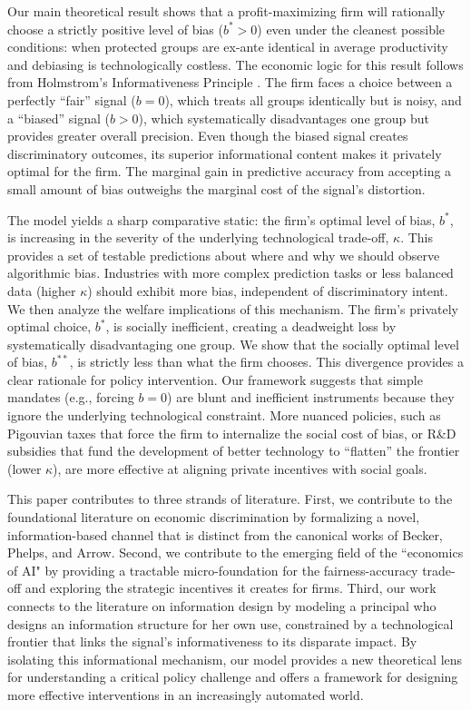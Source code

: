 Our main theoretical result shows that a profit-maximizing firm will rationally choose a strictly positive level of bias ($b^* > 0$) even under the cleanest possible conditions: when protected groups are ex-ante identical in average productivity and debiasing is technologically costless. The economic logic for this result follows from Holmstrom's Informativeness Principle \citep{Holmstrom1979} . The firm faces a choice between a perfectly ``fair'' signal ($b=0$), which treats all groups identically but is noisy, and a ``biased'' signal ($b>0$), which systematically disadvantages one group but provides greater overall precision. Even though the biased signal creates discriminatory outcomes, its superior informational content makes it privately optimal for the firm. The marginal gain in predictive accuracy from accepting a small amount of bias outweighs the marginal cost of the signal's distortion.

The model yields a sharp comparative static: the firm's optimal level of bias, $b^*$, is increasing in the severity of the underlying technological trade-off, $\kappa$. This provides a set of testable predictions about where and why we should observe algorithmic bias. Industries with more complex prediction tasks or less balanced data (higher $\kappa$) should exhibit more bias, independent of discriminatory intent. We then analyze the welfare implications of this mechanism. The firm's privately optimal choice, $b^*$, is socially inefficient, creating a deadweight loss by systematically disadvantaging one group. We show that the socially optimal level of bias, $b^{**}$, is strictly less than what the firm chooses. This divergence provides a clear rationale for policy intervention. Our framework suggests that simple mandates (e.g., forcing $b=0$) are blunt and inefficient instruments because they ignore the underlying technological constraint. More nuanced policies, such as Pigouvian taxes that force the firm to internalize the social cost of bias, or R\&D subsidies that fund the development of better technology to ``flatten'' the frontier (lower $\kappa$), are more effective at aligning private incentives with social goals.

This paper contributes to three strands of literature. First, we contribute to the foundational literature on economic discrimination by formalizing a novel, information-based channel that is distinct from the canonical works of Becker, Phelps, and Arrow. Second, we contribute to the emerging field of the ``economics of AI" by providing a tractable micro-foundation for the fairness-accuracy trade-off and exploring the strategic incentives it creates for firms. Third, our work connects to the literature on information design \citep{Kamenica2011, Bergemann2019} by modeling a principal who designs an information structure for her own use, constrained by a technological frontier that links the signal's informativeness to its disparate impact. By isolating this informational mechanism, our model provides a new theoretical lens for understanding a critical policy challenge and offers a framework for designing more effective interventions in an increasingly automated world.